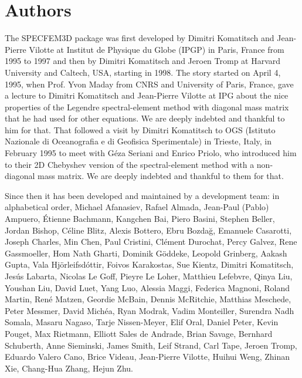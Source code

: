 \section*{Authors}

\noindent The SPECFEM3D package was first developed by Dimitri
Komatitsch and Jean-Pierre Vilotte at Institut de Physique du Globe
(IPGP) in Paris, France from 1995 to 1997 and then by Dimitri Komatitsch
and Jeroen Tromp at Harvard University and Caltech, USA, starting in 1998.
The story started on April 4, 1995, when Prof. Yvon Maday from CNRS and University of Paris, France, gave a lecture to
Dimitri Komatitsch and Jean-Pierre Vilotte at IPG about the nice properties of the Legendre spectral-element method with diagonal mass matrix that he had used for
other equations. We are deeply indebted and thankful to him for that.
That followed a visit by Dimitri Komatitsch to OGS (Istituto Nazionale di Oceanografia e di Geofisica Sperimentale) in Trieste, Italy, in February 1995
to meet with G\'eza Seriani and Enrico Priolo, who introduced him to their 2D Chebyshev version of the spectral-element method with a non-diagonal mass matrix.
We are deeply indebted and thankful to them for that.\newline


Since then it has been developed and maintained by a development team: in alphabetical order,
Michael Afanasiev,
Rafael Almada,
Jean-Paul (Pablo) Ampuero,
\'Etienne Bachmann,
Kangchen Bai,
Piero Basini,
Stephen Beller,
Jordan Bishop,
C\'eline Blitz,
Alexis Bottero,
Ebru Bozda\u{g},
Emanuele Casarotti,
Joseph Charles,
Min Chen,
Paul Cristini,
Cl\'ement Durochat,
Percy Galvez,
Rene Gassmoeller,
Hom Nath Gharti,
Dominik G\"oddeke,
Leopold Grinberg,
Aakash Gupta,
Vala Hj\"orleifsd\'ottir,
Foivos Karakostas,
Sue Kientz,
Dimitri Komatitsch,
Jes\'us Labarta,
Nicolas Le Goff,
Pieyre Le Loher,
Matthieu Lefebvre,
Qinya Liu,
Youshan Liu,
David Luet,
Yang Luo,
Alessia Maggi,
Federica Magnoni,
Roland Martin,
Ren\'e Matzen,
Geordie McBain,
Dennis McRitchie,
Matthias Meschede,
Peter Messmer,
David Mich\'ea,
Ryan Modrak,
Vadim Monteiller,
Surendra Nadh Somala,
Masaru Nagaso,
Tarje Nissen-Meyer,
Elif Oral,
Daniel Peter,
Kevin Pouget,
Max Rietmann,
Elliott Sales de Andrade,
Brian Savage,
Bernhard Schuberth,
Anne Sieminski,
James Smith,
Leif Strand,
Carl Tape,
Jeroen Tromp,
Eduardo Valero Cano,
Brice Videau,
Jean-Pierre Vilotte,
Huihui Weng,
Zhinan Xie,
Chang-Hua Zhang,
Hejun Zhu.\newline

